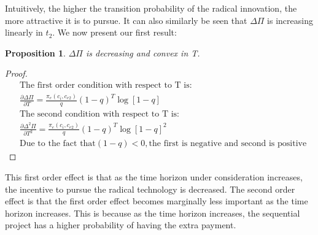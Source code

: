 \documentclass[12pt]{report}
\newtheorem{proposition}{Proposition}
\numberwithin{equation}{section}
\begin{document}
Intuitively, the higher the transition probability of the radical innovation, the more attractive it is to pursue. It can also similarly be seen that $\Delta \Pi$ is increasing linearly in $t_2$. We now present our first result:  
\begin{proposition}
$\Delta \Pi$ is decreasing and convex in T.
\end{proposition}
\begin{proof}
\begin{align*}
&\text{The first order condition with respect to T is:} \\
&\frac{\partial \Delta \Pi}{\partial T}=\frac{\pi_{e}(c_i,c_{e2})}{q} (1-q)^{T} \log[1-q] \\
&\text{The second condition with respect to T is:} \\
&\frac{\partial \Delta^2 \Pi}{\partial T^2} = \frac{\pi_{e}(c_i,c_{e2})}{q} (1-q)^{T} \log[1-q]^2 \\
&\text{Due to the fact that} (1-q) <0, \text{the first is negative and second is positive}
\end{align*}
\end{proof}

This first order effect is that as the time horizon under consideration increases, the incentive to pursue the radical technology is decreased. The second order effect is that the first order effect becomes marginally less important as the time horizon increases. This is because as the time horizon increases, the sequential project has a higher probability of having the extra payment. 
\end{document}
